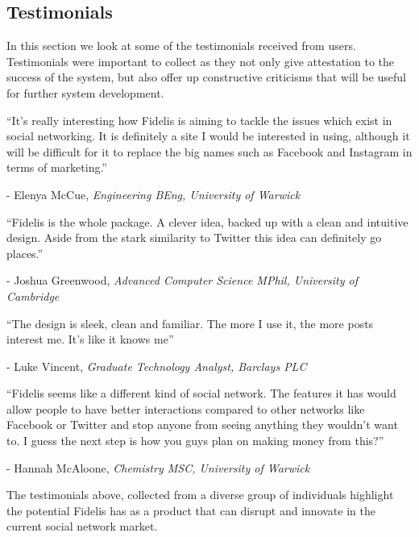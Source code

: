 \subsection{Testimonials}
In this section we look at some of the testimonials received from users. Testimonials were important to collect as they not only give attestation to the success of the system, but also offer up constructive criticisms that will be useful for further system development.

\begin{displayquote}
	\enquote{It's really interesting how Fidelis is aiming to tackle the issues which exist in social networking. It is definitely a site I would be interested in using, although it will be difficult for it to replace the big names such as Facebook and Instagram in terms of marketing.}
	
	- Elenya McCue, \textit{Engineering BEng, University of Warwick}
\end{displayquote}

\begin{displayquote}
	\enquote{Fidelis is the whole package. A clever idea, backed up with a clean and intuitive design. Aside from the stark similarity to Twitter this idea can definitely go places.}
	
	- Joshua Greenwood, \textit{Advanced Computer Science MPhil, University of Cambridge}
\end{displayquote}

\begin{displayquote}
	\enquote{The design is sleek, clean and familiar. The more I use it, the more posts interest me. It's like it knows me} 
	
	- Luke Vincent, \textit{Graduate Technology Analyst, Barclays PLC}
\end{displayquote}

\begin{displayquote}
	\enquote{Fidelis seems like a different kind of social network. The features it has would allow people to have better interactions compared to other networks like Facebook or Twitter and stop anyone from seeing anything they wouldn't want to. I guess the next step is how you guys plan on making money from this?}
	
	- Hannah McAloone, \textit{Chemistry MSC, University of Warwick}
\end{displayquote}

\noindent The testimonials above, collected from a diverse group of individuals highlight the potential Fidelis has as a product that can disrupt and innovate in the current social network market. 